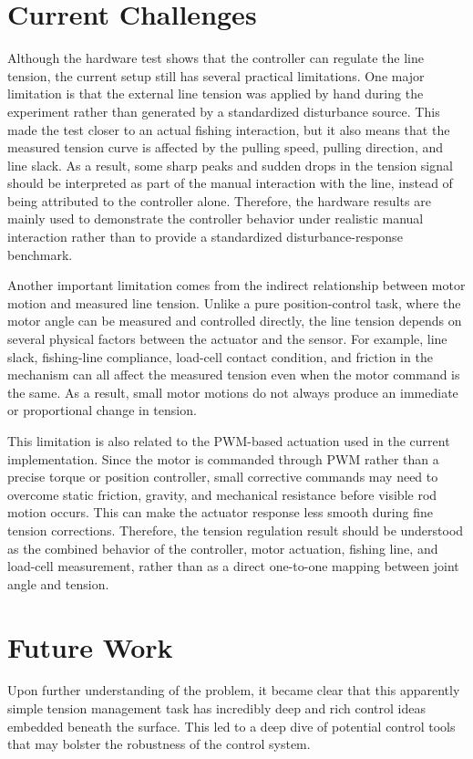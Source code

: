 \documentclass[conference]{IEEEtran}
\begin{document}
\section{Current Challenges}
Although the hardware test shows that the controller can regulate the line tension, the current setup still has several practical limitations. One major limitation is that the external line tension was applied by hand during the experiment rather than generated by a standardized disturbance source. This made the test closer to an actual fishing interaction, but it also means that the measured tension curve is affected by the pulling speed, pulling direction, and line slack. As a result, some sharp peaks and sudden drops in the tension signal should be interpreted as part of the manual interaction with the line, instead of being attributed to the controller alone. Therefore, the hardware results are mainly used to demonstrate the controller behavior under realistic manual interaction rather than to provide a standardized disturbance-response benchmark.

Another important limitation comes from the indirect relationship between motor motion and measured line tension. Unlike a pure position-control task, where the motor angle can be measured and controlled directly, the line tension depends on several physical factors between the actuator and the sensor. For example, line slack, fishing-line compliance, load-cell contact condition, and friction in the mechanism can all affect the measured tension even when the motor command is the same. As a result, small motor motions do not always produce an immediate or proportional change in tension.

This limitation is also related to the PWM-based actuation used in the current implementation. Since the motor is commanded through PWM rather than a precise torque or position controller, small corrective commands may need to overcome static friction, gravity, and mechanical resistance before visible rod motion occurs. This can make the actuator response less smooth during fine tension corrections. Therefore, the tension regulation result should be understood as the combined behavior of the controller, motor actuation, fishing line, and load-cell measurement, rather than as a direct one-to-one mapping between joint angle and tension.

\section{Future Work}
Upon further understanding of the problem, it became clear that this apparently simple tension management task has incredibly deep and rich control ideas embedded beneath the surface. This led to a deep dive of potential control tools that may bolster the robustness of the control system.
\end{document}
